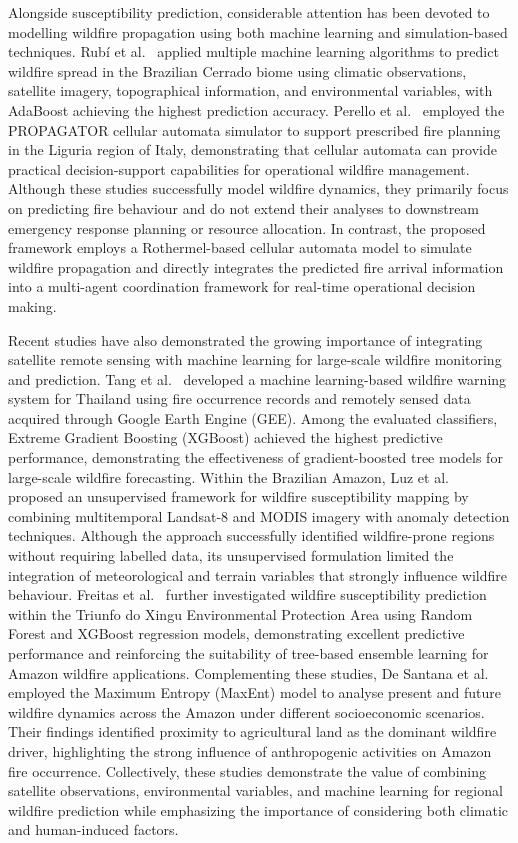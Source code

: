 \documentclass{ieeeaccess}
\begin{document}
Alongside susceptibility prediction, considerable attention has been devoted to modelling wildfire propagation using both machine learning and simulation-based techniques. Rubí et al.~\cite{5} applied multiple machine learning algorithms to predict wildfire spread in the Brazilian Cerrado biome using climatic observations, satellite imagery, topographical information, and environmental variables, with AdaBoost achieving the highest prediction accuracy. Perello et al.~\cite{8} employed the PROPAGATOR cellular automata simulator to support prescribed fire planning in the Liguria region of Italy, demonstrating that cellular automata can provide practical decision-support capabilities for operational wildfire management. Although these studies successfully model wildfire dynamics, they primarily focus on predicting fire behaviour and do not extend their analyses to downstream emergency response planning or resource allocation. In contrast, the proposed framework employs a Rothermel-based cellular automata model to simulate wildfire propagation and directly integrates the predicted fire arrival information into a multi-agent coordination framework for real-time operational decision making.

Recent studies have also demonstrated the growing importance of integrating satellite remote sensing with machine learning for large-scale wildfire monitoring and prediction. Tang et al.~\cite{6} developed a machine learning-based wildfire warning system for Thailand using fire occurrence records and remotely sensed data acquired through Google Earth Engine (GEE). Among the evaluated classifiers, Extreme Gradient Boosting (XGBoost) achieved the highest predictive performance, demonstrating the effectiveness of gradient-boosted tree models for large-scale wildfire forecasting. Within the Brazilian Amazon, Luz et al.~\cite{7} proposed an unsupervised framework for wildfire susceptibility mapping by combining multitemporal Landsat-8 and MODIS imagery with anomaly detection techniques. Although the approach successfully identified wildfire-prone regions without requiring labelled data, its unsupervised formulation limited the integration of meteorological and terrain variables that strongly influence wildfire behaviour. Freitas et al.~\cite{9} further investigated wildfire susceptibility prediction within the Triunfo do Xingu Environmental Protection Area using Random Forest and XGBoost regression models, demonstrating excellent predictive performance and reinforcing the suitability of tree-based ensemble learning for Amazon wildfire applications. Complementing these studies, De Santana et al.~\cite{10} employed the Maximum Entropy (MaxEnt) model to analyse present and future wildfire dynamics across the Amazon under different socioeconomic scenarios. Their findings identified proximity to agricultural land as the dominant wildfire driver, highlighting the strong influence of anthropogenic activities on Amazon fire occurrence. Collectively, these studies demonstrate the value of combining satellite observations, environmental variables, and machine learning for regional wildfire prediction while emphasizing the importance of considering both climatic and human-induced factors.
\end{document}
